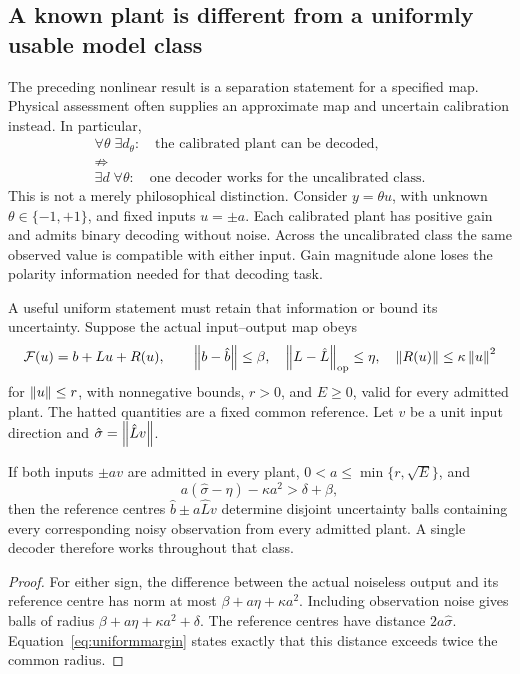\subsection{A known plant is different from a uniformly usable model class}\label{sec:uncertain}
The preceding nonlinear result is a separation statement for a specified map. Physical assessment often supplies an approximate map and uncertain calibration instead. In particular,
\[
 \begin{gathered}
 \forall\theta\;\exists d_\theta:\quad
 \text{the calibrated plant can be decoded},\\
 \not\Rightarrow\\
 \exists d\;\forall\theta:\quad
 \text{one decoder works for the uncalibrated class}.
 \end{gathered}
\]
This is not a merely philosophical distinction. Consider $y=\theta u$, with unknown $\theta\in\{-1,+1\}$, and fixed inputs $u=\pm a$. Each calibrated plant has positive gain and admits binary decoding without noise. Across the uncalibrated class the same observed value is compatible with either input. Gain magnitude alone loses the polarity information needed for that decoding task.

A useful uniform statement must retain that information or bound its uncertainty. Suppose the actual input--output map obeys
\[
 \mathcal F(u)=b+Lu+R(u),\qquad
 \left\lVert b-\hat b\right\rVert\leq\beta,\quad
 \left\lVert L-\hat L\right\rVert_{\mathrm{op}}\leq\eta,\quad
 \left\lVert R(u)\right\rVert\leq\kappa\left\lVert u\right\rVert^{2}
\]
for $\left\lVert u\right\rVert\leq r$, with nonnegative bounds, $r>0$, and $E\geq0$, valid for every admitted plant. The hatted quantities are a fixed common reference. Let $v$ be a unit input direction and $\hat\sigma=\left\lVert\hat L v\right\rVert$.

\begin{proposition}\label{prop:uniform}
If both inputs $\pm av$ are admitted in every plant, $0<a\leq\min\{r,\sqrt E\}$, and
\begin{equation}\label{eq:uniformmargin}
 a(\hat\sigma-\eta)-\kappa a^2>\delta+\beta,
\end{equation}
then the reference centres $\hat b\pm a\hat L v$ determine disjoint uncertainty balls containing every corresponding noisy observation from every admitted plant. A single decoder therefore works throughout that class.
\end{proposition}
\begin{proof}
For either sign, the difference between the actual noiseless output and its reference centre has norm at most $\beta+a\eta+\kappa a^2$. Including observation noise gives balls of radius $\beta+a\eta+\kappa a^2+\delta$. The reference centres have distance $2a\hat\sigma$. Equation~\eqref{eq:uniformmargin} states exactly that this distance exceeds twice the common radius.
\end{proof}

